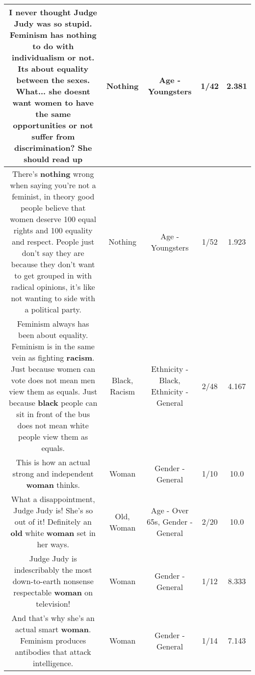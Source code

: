 \documentclass[11pt]{article}
\newlength\mylength
\begin{document}
\begin{center}
\begin{longtable}{|C{.65\mylength}|C{.30\mylength}|C{.12\mylength}|C{.12\mylength}|C{.12\mylength}|}
  \small I never thought Judge Judy was so stupid. Feminism has \textbf{nothing} to do with individualism or not. Its about equality between the sexes. What... she doesnt want women to have the same opportunities or not suffer from discrimination? She should read up\normalsize   & Nothing & Age - Youngsters & 1/42 & 2.381 \\  \hline
  \small There's \textbf{nothing} wrong when saying you're not a feminist, in theory good people believe that women deserve 100 equal rights and 100 equality and respect. People just don't say they are because they don't want to get grouped in with radical opinions, it's like not wanting to side with a political party.\normalsize   & Nothing & Age - Youngsters & 1/52 & 1.923 \\  \hline
  \small Feminism always has been about equality. Feminism is in the same vein as fighting \textbf{racism}. Just because women can vote does not mean men view them as equals. Just because \textbf{black} people can sit in front of the bus does not mean white people view them as equals.\normalsize   & Black, Racism & Ethnicity - Black, Ethnicity - General & 2/48 & 4.167 \\  \hline
  \small This is how an actual strong and independent \textbf{woman} thinks.\normalsize   & Woman & Gender - General & 1/10 & 10.0 \\  \hline
  \small What a disappointment, Judge Judy is! She's so out of it! Definitely an \textbf{old} white \textbf{woman} set in her ways.\normalsize   & Old, Woman & Age - Over 65s, Gender - General & 2/20 & 10.0 \\  \hline
  \small Judge Judy is indescribably the most down-to-earth nonsense  respectable \textbf{woman} on television!\normalsize   & Woman & Gender - General & 1/12 & 8.333 \\  \hline
  \small And that's why she's an actual smart \textbf{woman}.  Feminism produces antibodies that attack intelligence.\normalsize   & Woman & Gender - General & 1/14 & 7.143 \\  \hline

\end{longtable}
\end{center}
\end{document}
